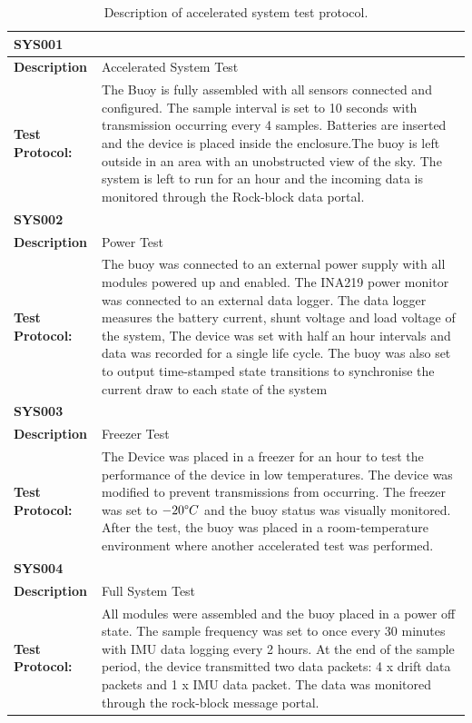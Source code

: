 \begin{table}[H]
    \centering
    \caption{Description of accelerated system test protocol.}
    \begin{tabular}{|m{}|m{}|}
    \multicolumn{2}{l}{\textbf{SYS001} }\\
    \hline
    \textbf{Description} & Accelerated System Test\\
    \hline
    \textbf{Test Protocol:} &  The Buoy is fully assembled with all sensors connected and configured. The sample interval is set to 10 seconds with transmission occurring every 4 samples. Batteries are inserted and the device is placed inside the enclosure.The buoy is left outside in an area with an unobstructed view of the sky. The system is left to run for an hour and the incoming data is monitored through the Rock-block data portal.\\
    \hline
    \multicolumn{2}{l}{\textbf{SYS002} }\\
    \hline
    \textbf{Description} &  Power Test\\
    \hline
    \textbf{Test Protocol:} & The buoy was connected to an external power supply with all modules powered up and enabled. The INA219 power monitor was connected to an external data logger. The data logger measures the battery current, shunt voltage and load voltage of the system, The device was set with half an hour intervals and data was recorded for a single life cycle. The buoy was also set to output time-stamped state transitions to synchronise the current draw to each state of the system\\
    \hline
    \multicolumn{2}{l}{\textbf{SYS003} }\\
    \hline
    \textbf{Description} &  Freezer Test\\
    \hline
    \textbf{Test Protocol:} &  The Device was placed in a freezer for an hour to test the performance of the device in low temperatures. The device was modified to prevent transmissions from occurring. The freezer was set to $-20\degree C$  and the buoy status was visually monitored. After the test, the buoy was placed in a room-temperature environment where another accelerated test was performed.\\
    \hline
    \multicolumn{2}{l}{\textbf{SYS004} }\\
    \hline
    \textbf{Description} &  Full System Test\\
    \hline
    \textbf{Test Protocol:} &  All modules were assembled and the buoy placed in a power off state. The sample frequency was set to once every 30 minutes with IMU data logging every 2 hours. At the end of the sample period, the device transmitted two data packets: 4 x drift data packets and 1 x IMU data packet. The data was monitored through the rock-block message portal. \\
    \hline
    
    \end{tabular} 
    \label{tab:test_Systemtest_descrip}
\end{table}

